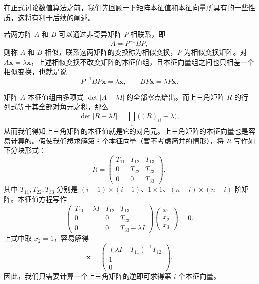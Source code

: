 在正式讨论数值算法之前，我们先回顾一下矩阵本征值和本征向量所具有的一些性质，这将有利于后续的阐述。

若两方阵 $A$ 和 $B$ 可以通过非奇异矩阵 $P$ 相联系，即
\begin{equation}
A=P^{-1}BP,
\tag{3.4.10}
\end{equation}
则称 $A$ 和 $B$ 相似，联系这两矩阵的变换称为相似变换，$P$ 为相似变换矩阵。对 $A\bm x=\lambda\bm x$，上述相似变换不改变矩阵的本征值组，且本征向量组之间也只相差一个相似变换，也就是说
\begin{equation}
P^{-1}BP\bm x=\lambda\bm x,
\qquad
BP\bm x=\lambda P\bm x.
\tag{3.4.11}
\end{equation}

矩阵 $A$ 本征值组由多项式 $\det|A-\lambda I|$ 的全部零点给出。而上三角矩阵 $R$ 的行列式等于其全部对角元之积，那么
\begin{equation}
\det|R-\lambda I|=\prod_i\bigl((R)_{ii}-\lambda\bigr),
\tag{3.4.12}
\end{equation}
从而我们得知上三角矩阵的本征值就是它的对角元。上三角矩阵的本征向量也是容易计算的。假使我们想求解第 $i$ 个本征向量（暂不考虑简并的情形），将 $R$ 写作如下分块形式：
\begin{equation}
R=\begin{pmatrix}
T_{11}&T_{12}&T_{13}\\
0&T_{22}&T_{23}\\
0&0&T_{33}
\end{pmatrix},
\tag{3.4.13}
\end{equation}
其中 $T_{11},T_{22},T_{33}$ 分别是 $(i-1)\times(i-1)$、$1\times1$、$(n-i)\times(n-i)$ 阶矩阵。本征值方程写作
\begin{equation}
\begin{pmatrix}
T_{11}-\lambda I&T_{12}&T_{13}\\
0&0&T_{23}\\
0&0&T_{33}-\lambda I
\end{pmatrix}
\begin{pmatrix}x_1\\x_2\\x_3\end{pmatrix}=0.
\tag{3.4.14}
\end{equation}
上式中取 $x_2=1$，容易解得
\begin{equation}
\bm x=\begin{pmatrix}(\lambda I-T_{11})^{-1}T_{12}\\1\\0\end{pmatrix}.
\tag{3.4.15}
\end{equation}
因此，我们只需要计算一个上三角矩阵的逆即可求得第 $i$ 个本征向量。


